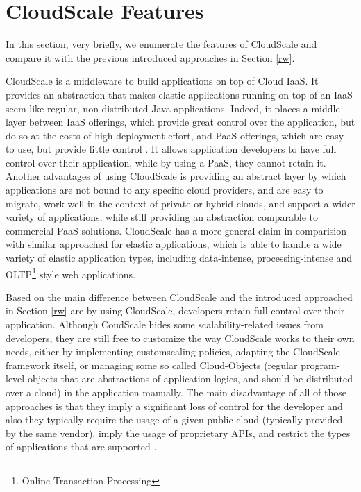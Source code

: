 \documentclass{sig-alternate}
\begin{document}
\section{CloudScale Features} {\label{cloudScale}
In this section, very briefly, we enumerate the features of CloudScale and compare it with the previous introduced approaches in Section \ref{rw}.

CloudScale is a middleware to build applications on top of Cloud IaaS. It provides an abstraction that makes elastic applications running on top of an IaaS seem like regular, non-distributed Java applications. Indeed, it places a middle layer between IaaS offerings, which provide great control over the application, but do so at the costs of high deployment effort, and PaaS offerings, which are easy to use, but provide little control \cite{leitner2012cloudscale}. It allows application developers to have full control over their application, while by using a PaaS, they cannot retain it. Another advantages of using CloudScale is providing an abstract layer by which applications are not bound to any specific cloud providers, and are easy to migrate, work well in the context of private or hybrid clouds, and support a wider variety of applications, while still providing an abstraction comparable to commercial PaaS solutions. CloudScale has a more general claim in comparision with similar approached for elastic applications, which is able to handle a wide variety of elastic application types, including data-intense, processing-intense and OLTP\footnote{Online Transaction Processing} style web applications\cite{Leitner2013}.

Based on \cite{leitner2012cloudscale} the main difference between CloudScale and the introduced approached in Section \ref{rw} are by using CloudScale, developers retain full control over their application. Although CoudScale hides some scalability-related issues from developers, they are still free to customize the way CloudScale works to their own needs, either by implementing customscaling policies, adapting the CloudScale framework itself, or managing some so called Cloud-Objects (regular program-level objects that are abstractions of application logics, and should be distributed over a cloud) in the application manually. The main disadvantage of all of those approaches is that they imply a significant loss of control for the developer and also they typically require the usage of a given public cloud (typically provided by the same vendor), imply the usage of proprietary APIs, and restrict the types of applications that are supported \cite{Leitner2013}.

}
\end{document}
